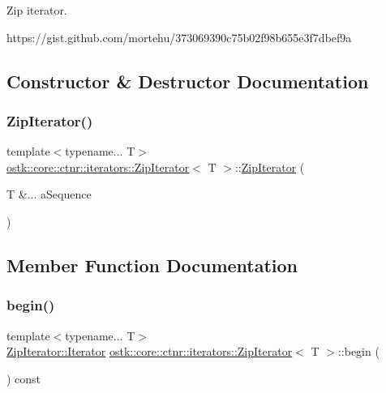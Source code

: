 Zip iterator. 

https\+://gist.github.\+com/mortehu/373069390c75b02f98b655e3f7dbef9a 

\subsection{Constructor \& Destructor Documentation}
\mbox{\label{classostk_1_1core_1_1ctnr_1_1iterators_1_1_zip_iterator_ac3ac6cb006cd9428ea66235a9d240221}} 
\subsubsection{\texorpdfstring{Zip\+Iterator()}{ZipIterator()}}
{\footnotesize\ttfamily template$<$typename... T$>$ \\
\hyperlink{classostk_1_1core_1_1ctnr_1_1iterators_1_1_zip_iterator}{ostk\+::core\+::ctnr\+::iterators\+::\+Zip\+Iterator}$<$ T $>$\+::\hyperlink{classostk_1_1core_1_1ctnr_1_1iterators_1_1_zip_iterator}{Zip\+Iterator} (\begin{DoxyParamCaption}\item[{T \&...}]{a\+Sequence }\end{DoxyParamCaption})\hspace{0.3cm}{\ttfamily [inline]}}



\subsection{Member Function Documentation}
\mbox{\label{classostk_1_1core_1_1ctnr_1_1iterators_1_1_zip_iterator_a9fd76a0b2306f00757c5a09accef725a}} 
\subsubsection{\texorpdfstring{begin()}{begin()}}
{\footnotesize\ttfamily template$<$typename... T$>$ \\
\hyperlink{classostk_1_1core_1_1ctnr_1_1iterators_1_1_zip_iterator_1_1_iterator}{Zip\+Iterator\+::\+Iterator} \hyperlink{classostk_1_1core_1_1ctnr_1_1iterators_1_1_zip_iterator}{ostk\+::core\+::ctnr\+::iterators\+::\+Zip\+Iterator}$<$ T $>$\+::begin (\begin{DoxyParamCaption}{ }\end{DoxyParamCaption}) const\hspace{0.3cm}{\ttfamily [inline]}}

